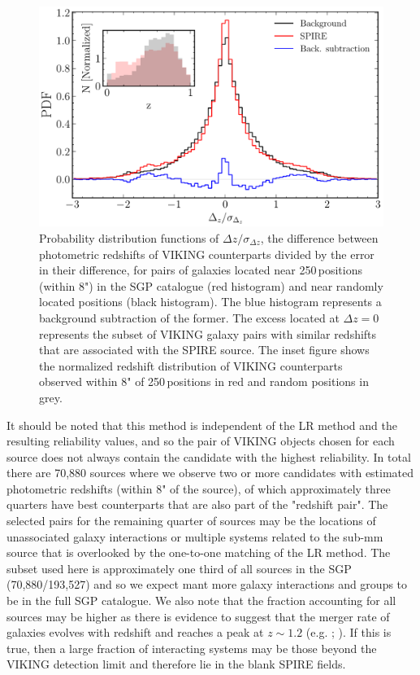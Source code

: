\begin{figure}
    \centering
    \includegraphics[width=\columnwidth]{Figures/delta_z_multiplicity.pdf}
    \caption{Probability distribution functions of $\Delta z/\sigma_{\Delta z}$, the difference between photometric redshifts of VIKING counterparts divided by the error in their difference, for pairs of galaxies located near 250\,\micron positions (within 8") in the SGP catalogue (red histogram) and near randomly located positions (black histogram). The blue histogram represents a background subtraction of the former. The excess located at $\Delta z = 0$ represents the subset of VIKING galaxy pairs with similar redshifts that are associated with the SPIRE source. The inset figure shows the normalized redshift distribution of VIKING counterparts observed within 8" of 250\,\micron positions in red and random positions in grey.}
    \label{fig:delta_z_multiplicity}
\end{figure}

It should be noted that this method is independent of the LR method and the resulting reliability values, and so the pair of VIKING objects chosen for each source does not always contain the candidate with the highest reliability. In total there are 70,880 sources where we observe two or more candidates with estimated photometric redshifts (within 8" of the source), of which approximately three quarters have best counterparts that are also part of the "redshift pair". The selected pairs for the remaining quarter of sources may be the locations of unassociated galaxy interactions or multiple systems related to the sub-mm source that is overlooked by the one-to-one matching of the LR method. The subset used here is approximately one third of all sources in the SGP (70,880/193,527) and so we expect mant more galaxy interactions and groups to be in the full SGP catalogue. We also note that the fraction accounting for all sources may be higher as there is evidence to suggest that the merger rate of galaxies evolves with redshift and reaches a peak at $z \sim 1.2$ (e.g. \citealt{Bell_2006}; \citealt{Ryan_2008}). If this is true, then a large fraction of interacting systems may be those beyond the VIKING detection limit and therefore lie in the blank SPIRE fields.

